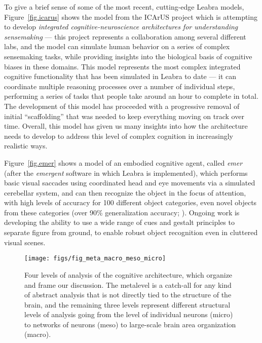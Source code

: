\documentclass[11pt,twoside]{article}
\begin{document}
To give a brief sense of some of the most recent, cutting-edge Leabra models,
Figure~\ref{fig.icarus} shows the model from the ICArUS project which is
attempting to develop {\em integrated cognitive-neuroscience architectures for
  understanding sensemaking} --- this project represents a collaboration among
several different labs, and the model can simulate human behavior on a series
of complex sensemaking tasks, while providing insights into the biological
basis of cognitive biases in these domains.  This model represents the most
complex integrated cognitive functionality that has been simulated in Leabra
to date --- it can coordinate multiple reasoning processes over a number of
individual steps, performing a series of tasks that people take around an hour
to complete in total.  The development of this model has proceeded with a
progressive removal of initial ``scaffolding'' that was needed to keep
everything moving on track over time.  Overall, this model has given us many
insights into how the architecture needs to develop to address this level of
complex cognition in increasingly realistic ways.

Figure~\ref{fig.emer} shows a model of an embodied cognitive agent, called
{\em emer} (after the {\em emergent} software in which Leabra is implemented),
which performs basic visual saccades using coordinated head and eye movements
via a simulated cerebellar system, and can then recognize the object in the
focus of attention, with high levels of accuracy for 100 different object
categories, even novel objects from these categories (over 90\% generalization
accuracy; ).  Ongoing work is developing the ability to
use a wide range of cues and gestalt principles to separate figure from
ground, to enable robust object recognition even in cluttered visual scenes.

\begin{figure}
  \centering\texttt{[image: figs/fig\_meta\_macro\_meso\_micro]}
  \caption{\small Four levels of analysis of the cognitive architecture, which
    organize and frame our discussion.  The metalevel is a catch-all for any kind of abstract analysis that is not directly tied to the structure of the brain, and the remaining three levels represent different structural levels of analysis going from the level of individual neurons (micro) to networks of neurons (meso) to large-scale brain area organization (macro).}
  \label{fig.levels}
\end{figure}
\end{document}
